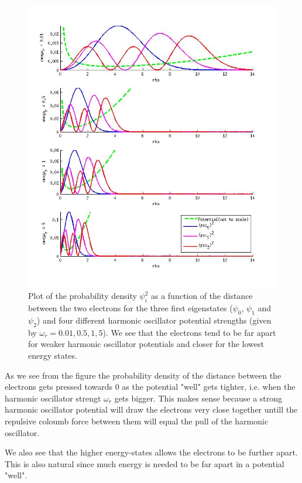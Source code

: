 \documentclass[a4paper,10pt,english]{article}
\numberwithin{figure}{subsection}
\numberwithin{table}{subsection}
\numberwithin{equation}{subsection}
\begin{document}
\begin{figure}[h!]
  \centering
  \includegraphics[width=\textwidth]{two_electrons.jpg}
  \caption{Plot of the probability density $\psi_i^2$ 
  as a function of the distance between the two electrons for 
  the three first eigenstates ($\psi_0$, $\psi_1$ and $\psi_2$)
  and four different 
  harmonic oscillator potential strengths (given by $\omega_r = 0.01, 0.5, 1 , 5$).
  We see that the electrons tend to be far apart for weaker harmonic oscillator potentials 
  and closer for the lowest energy states.}
  \label{fig:two_electrons}
\end{figure}

As we see from the figure the probability density of the distance between the electrons 
gets pressed towards $0$ as the potential "well" gets tighter, 
i.e. when the harmonic oscillator strengt $\omega_r$ gets bigger. 
This makes sense because a strong harmonic oscillator potential will 
draw the electrons very close together untill the repulsive coloumb force between them will 
equal the pull of the harmonic oscillator. 

We also see that the higher energy-states allows the electrons to be further apart. 
This is also natural since much energy is needed to be far apart in a potential "well".
\end{document}
